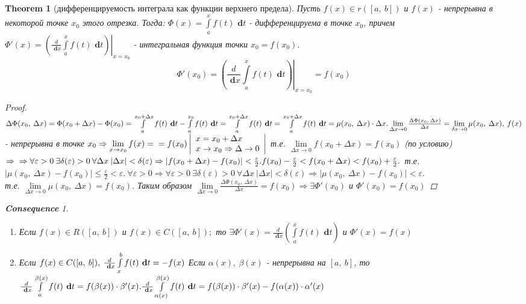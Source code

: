 \documentclass[a4paper,12pt]{bookest}
\newtheorem{theorem}{Theorem}[section]
\theoremstyle{remark}
\newtheorem*{cons*}{\textbf{Consequence}}
\newcommand\dx{\textbf{ d}x}
\newcommand\dy{\textbf{ d}}
\begin{document}
\begin{theorem}[дифференцируемость интеграла как функции верхнего предела]
	Пусть $f(x)\in r([a,\>b])$ и $f(x)$ - непрерывна в некоторой точке $x_0$ этого отрезка. Тогда: $\Phi(x)=\int\limits_{a}^{x}f(t)\dy t$ - дифференцируема в точке $x_0$, причем $\Phi'(x)=\left.\left(\frac d{\dx}\int\limits_{a}^{x}f(t)\dy t\right)\right|_{x=x_0}$ - интегральная функция точки $x_0=f(x_0).$ $$\Phi'(x_0)=\left.\left(\frac d{\dx}\int\limits_{a}^{x}f(t)\dy t\right)\right|_{x=x_0}=f(x_0)$$
	\begin{proof}
		$\Delta\Phi (x_0,\>\Delta x)=\Phi(x_0+\Delta x)-\Phi(x_0)=\int\limits_{a}^{x_0+\Delta x}f(t)\dy t-\int\limits_{a}^{x_0}f(t)\dy t=\int\limits_{a}^{x_0+\Delta x}f(t)\dy t=\int\limits_{a}^{x_0+\Delta x}f(t)\dy t=\mu(x_0,\>\Delta x)\cdot\Delta x.\\\lim\limits_{\Delta x\to0}\frac{\Delta\Phi(x_0,\>\Delta x)}{\Delta x}=\lim\limits_{\delta x\to0}\mu(x_0,\>\Delta x),\>f(x)$ - непрерывна в точке $x_0\Rightarrow\lim\limits_{x\to x_0}f(x)=\\=f(x_0)\left| \begin{array}{l}
			x=x_0+\Delta x\\x\to x_0\Rightarrow\Delta\to0
		\end{array}\right|$ т.е. $\lim\limits_{\Delta x\to0}f(x_0+\Delta x)=f(x_0)$ (по условию) $\Rightarrow\\\Rightarrow\forall\varepsilon>0\>\exists\delta(\varepsilon)>0\>\forall\Delta x\>|\Delta x|<\delta(\varepsilon)\Rightarrow|f(x_0+\Delta x)-f(x_0)|<\frac\varepsilon2.\\f(x_0)-\frac{\varepsilon}{2}<f(x_0+\Delta x)<f(x_0)+\frac\varepsilon2.$ т.е. $|\mu(x_0,\>\Delta x)-f(x_0)|\leq \frac{\varepsilon}{2}<\varepsilon.\>\forall\varepsilon>0\Rightarrow\forall\varepsilon>0\>\exists\delta(\varepsilon)>0\>\forall\Delta x\>|\Delta x|<\delta(\varepsilon)\Rightarrow|\mu(x_0,\>\Delta x)-f(x_0)|<\varepsilon.$\\ т.е. $\lim\limits_{\Delta x\to0}\mu(x_0,\>\Delta x)=f(x_0).$ Таким образом $\lim\limits_{\Delta x\to0}\frac{\Delta\Phi(x_0,\>\Delta x)}{\Delta x}=f(x_0)\Rightarrow\exists\Phi'(x_0)$ и $\Phi'(x_0)=f(x_0)$ 
 	\end{proof}
 	\begin{cons*}$ $
 		\begin{enumerate}
 			\item Если $f(x)\in R([a,\>b])$ и $f(x)\in C([a,\>b]);$ то $\exists\Phi'(x)=\frac{d}{\dx}\left(\int\limits_{a}^{x}f(t)\dy t\right)$ и $\Phi'(x)=f(x)$
 			\item Если $f(x)\in C([a,\>b]),\>\frac{d}{\dx}\int\limits_{x}^{b}f(t)\dy t=-f(x)\\$ Если $\alpha(x),\>\beta(x)$ - непрерывна на $[a,\>b]$, то $\frac{d}{\dx}\int\limits_{a}^{\beta(x)}f(t)\dy t=f(\beta(x))\cdot\beta'(x).\\\frac{d}{\dx}\int\limits_{\alpha(x)}^{\beta(x)}f(t)\dy t=f(\beta(x))\cdot\beta'(x)-f(\alpha(x))\cdot\alpha'(x)$ 
 		\end{enumerate}
 	\end{cons*}
\end{theorem}
\end{document}
